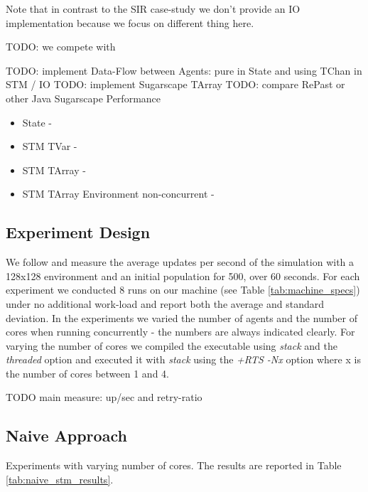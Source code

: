 Note that in contrast to the SIR case-study we don't provide an IO implementation because we focus on different thing here. 

TODO: we compete with \cite{lysenko_framework_2008}

TODO: implement Data-Flow between Agents: pure in State and using TChan in STM / IO
TODO: implement Sugarscape TArray
TODO: compare RePast or other Java Sugarscape Performance

\begin{itemize}
	\item State - 
	\item STM TVar -
	\item STM TArray -
	\item STM TArray Environment non-concurrent -
\end{itemize}

\subsection{Experiment Design}
We follow \cite{lysenko_framework_2008} and measure the average updates per second of the simulation with a 128x128 environment and an initial population for 500, over 60 seconds. For each experiment we conducted 8 runs on our machine (see Table \ref{tab:machine_specs}) under no additional work-load and report both the average and standard deviation. In the experiments we varied the number of agents and the number of cores when running concurrently - the numbers are always indicated clearly. For varying the number of cores we compiled the executable using \textit{stack} and the \textit{threaded} option and executed it with \textit{stack} using the \textit{+RTS -Nx} option where x is the number of cores between 1 and 4. 

TODO main measure: up/sec and retry-ratio

\subsection{Naive Approach}
Experiments with varying number of cores. The results are reported in Table \ref{tab:naive_stm_results}.

